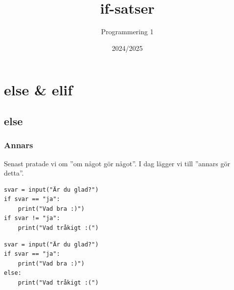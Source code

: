 \documentclass[aspectratio=169]{beamer}
\begin{document}


\title{if-satser}
\author{Programmering 1}
\date{2024/2025}

\maketitle


\section{else \& elif}

\subsection{else}

\begin{frame}[fragile]
	\frametitle{Annars}
	
	Senast pratade vi om ''om något gör något''. I dag lägger vi till ''annars gör detta''.
	
	\pause
	
	\begin{lstlisting}
svar = input("Är du glad?")
if svar == "ja":
	print("Vad bra :)")
if svar != "ja":
	print("Vad tråkigt :(")
	\end{lstlisting}
	
	\pause

	\begin{lstlisting}
svar = input("Är du glad?")
if svar == "ja":
	print("Vad bra :)")
else:
	print("Vad tråkigt :(")
	\end{lstlisting}

\end{frame}
\end{document}
